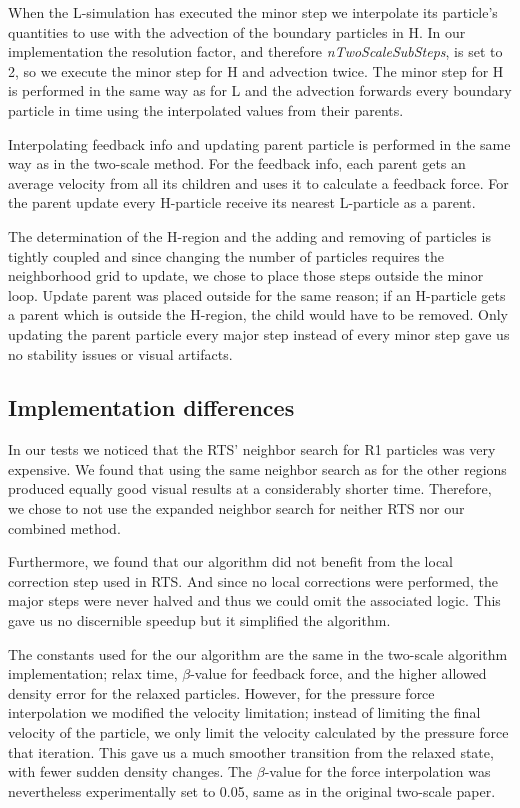 \documentclass[../../main.tex]{subfiles}
\begin{document}
When the L-simulation has executed the minor step we interpolate its particle's quantities to use with the advection of the boundary particles in H. In our implementation the resolution factor, and therefore \textit{nTwoScaleSubSteps}, is set to 2, so we execute the minor step for H and advection twice. The minor step for H is performed in the same way as for L and the advection forwards every boundary particle in time using the interpolated values from their parents.

Interpolating feedback info and updating parent particle is performed in the same way as in the two-scale method. For the feedback info, each parent gets an average velocity from all its children and uses it to calculate a feedback force. For the parent update every H-particle receive its nearest L-particle as a parent. 

The determination of the H-region and the adding and removing of particles is tightly coupled and since changing the number of particles requires the neighborhood grid to update, we chose to place those steps outside the minor loop. Update parent was placed outside for the same reason; if an H-particle gets a parent which is outside the H-region, the child would have to be removed. Only updating the parent particle every major step instead of every minor step gave us no stability issues or visual artifacts. 


\subsection{Implementation differences}
In our tests we noticed that the RTS' neighbor search for R1 particles was very expensive. We found that using the same neighbor search as for the other regions produced equally good visual results at a considerably shorter time. Therefore, we chose to not use the expanded neighbor search for neither RTS nor our combined method. 

Furthermore, we found that our algorithm did not benefit from the local correction step used in RTS. And since no local corrections were performed, the major steps were never halved and thus we could omit the associated logic. This gave us no discernible speedup but it simplified the algorithm. 

The constants used for the our algorithm are the same in the two-scale algorithm implementation; relax time, $\beta$-value for feedback force, and the higher allowed density error for the relaxed particles. However, for the pressure force interpolation we modified the velocity limitation; instead of limiting the final velocity of the particle, we only limit the velocity calculated by the pressure force that iteration. This gave us a much smoother transition from the relaxed state, with fewer sudden density changes. The $\beta$-value for the force interpolation was nevertheless experimentally set to 0.05, same as in the original two-scale paper. 
\end{document}
